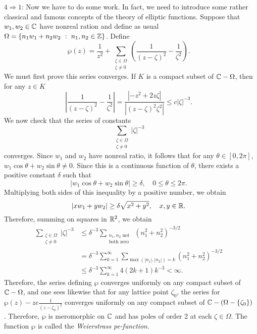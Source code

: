 \documentclass[a4paper,11pt]{article}
\begin{document}
\begin{mdframed}
  \underline{$4 \Rightarrow 1$}:
  Now we have to do some work.  In fact, we need to introduce some
  rather classical and famous concepts of the theory of elliptic
  functions.  Suppose that $w_1, w_2 \in {\mathbb C}$ have nonreal ration and
  define as usual $\Omega = \{n_1 w_1 + n_2 w_2 ~:~ n_1, n_2 \in
  {\mathbb Z}\}$.   Define
  $$
  \wp(z) = \frac{1}{z^2} + \sum_{\substack{\zeta \in \Omega\\ \zeta
      \ne 0}}(\frac{1}{(z-\zeta)^2} - \frac{1}{\zeta^2}).
  $$
  We must first prove this series converges.  If $K$ is a compact
  subset of ${\mathbb C} - \Omega$, then for any $z \in K$
  $$
  \left| \frac{1}{(z-\zeta)^2} - \frac{1}{\zeta^2} \right|
    = \frac{|-z^2 + 2z\zeta|}{|(z-\zeta)^2\zeta^2|}
    \le c |\zeta|^{-3}.
  $$
  We now check that the series of constants
  $$
  \sum_{\substack{\zeta \in \Omega\\ \zeta \ne 0}} |\zeta|^{-3}
  $$
  converges.  Since $w_1$ and $w_2$ have nonreal ratio, it follows
  that for any $\theta \in [0, 2\pi]$, $w_1 \cos \theta + w_2 \sin
  \theta \ne 0$.  Since this is a continuous function of $\theta$,
  there exists a positive constant $\delta$ such that
  $$
  |w_1 \cos \theta + w_2 \sin \theta|
  \ge \delta, \quad 0 \le \theta \le 2\pi.
  $$
  Multiplying both sides of this inequality by a positive number, we
  obtain
  $$
  |x w_1 + y w_2| \ge \delta\sqrt{x^2 + y^2},\quad x,y\in {\mathbb R}.
  $$
  Therefore, summing on squares in ${\mathbb R}^2$, we obtain
  $$
  \begin{aligned}
    \sum_{\substack{\zeta \in \Omega\\ \zeta \ne 0}} |\zeta|^{-3} 
    &\le \delta^{-3} \sum_{\substack{n_1,n_2\text{ not }\\\text{both
          zero}}} (n_1^2 + n_2^2)^{-3/2}\\
    &= \delta^{-3} \sum_{k=1}^{\infty} \sum_{\max(|n_1|,|n_2|)=k}
    (n_1^2 + n_2^2)^{-3/2}\\
    &\le \delta^{-3} \sum_{k=1}^{\infty} 4(2k+1)k^{-3} < \infty.
  \end{aligned}
  $$
  Therefore, the series defining $\wp$ converges uniformly on any
  compact subset of ${\mathbb C} - \Omega$, and one sees likewise that for
  any lattice point $\zeta_0$, the series for $\wp(z) -
ze  \frac{1}{(z-\zeta_0)^2}$ converges uniformly on any compact subset
  of ${\mathbb C} - (\Omega - \{\zeta_0\})$.  Therefore, $\wp$ is meromorphic
  on ${\mathbb C}$ and has poles of order 2 at each $\zeta \in \Omega$.  The
  function $\wp$ is called the \emph{Weierstrass pe-function}.


\end{mdframed}
\end{document}

